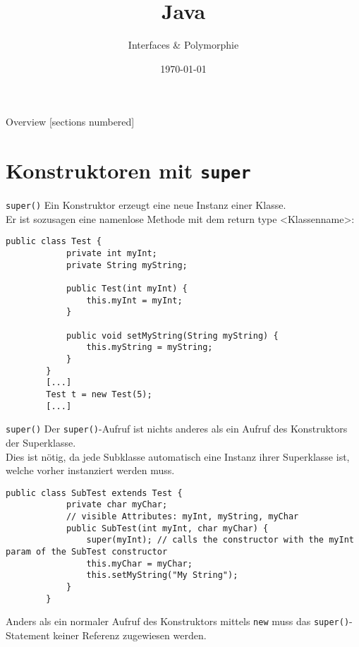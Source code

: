 

\usepackage{csquotes}
\usepackage{mathtools}

\title{Java}
\subtitle{Interfaces \& Polymorphie}
\date{\today}



\begin{frame}
\titlepage
\end{frame}

\begin{frame}{Overview}
    [sections numbered]
    \tableofcontents
\end{frame}

\section{Konstruktoren mit \texttt{super}}
\begin{frame}[fragile]{\texttt{super()}}
    Ein Konstruktor erzeugt eine neue Instanz einer Klasse. \\
    Er ist sozusagen eine namenlose Methode mit dem return type <Klassenname>:
    \begin{lstlisting}[gobble=8]
        public class Test {
            private int myInt;
            private String myString;

            public Test(int myInt) {
                this.myInt = myInt;
            }

            public void setMyString(String myString) {
                this.myString = myString;
            }
        }
        [...]
        Test t = new Test(5);
        [...]
    \end{lstlisting}
\end{frame}

\begin{frame}[fragile]{\texttt{super()}}
    Der \texttt{super()}-Aufruf ist nichts anderes als ein Aufruf des Konstruktors der Superklasse. \\
    Dies ist nötig, da jede Subklasse automatisch eine Instanz ihrer Superklasse ist, welche vorher instanziert werden muss.
    \begin{lstlisting}[gobble=8]
        public class SubTest extends Test {
            private char myChar;
            // visible Attributes: myInt, myString, myChar
            public SubTest(int myInt, char myChar) {
                super(myInt); // calls the constructor with the myInt param of the SubTest constructor
                this.myChar = myChar;
                this.setMyString("My String");
            }
        }
    \end{lstlisting}
    Anders als ein normaler Aufruf des Konstruktors mittels \texttt{new} muss das \texttt{super()}-Statement keiner Referenz zugewiesen werden.
\end{frame}

